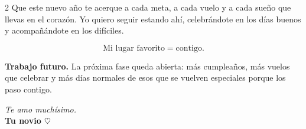 \documentclass[10pt,letterpaper]{article}
\begin{document}
\begin{multicols}{2}
Que este nuevo año te acerque a cada meta, a cada vuelo y a cada sueño que llevas en el corazón. Yo quiero seguir estando ahí, celebrándote en los días buenos y acompañándote en los difíciles.

\begin{equation*}
\boxed{\text{Mi lugar favorito}=\text{contigo}.}
\end{equation*}

\smallskip
\textbf{Trabajo futuro.} La próxima fase queda abierta: más cumpleaños, más vuelos que celebrar y más días normales de esos que se vuelven especiales porque los paso contigo.

\begin{flushright}
\textit{Te amo muchísimo.}\\
\textbf{Tu novio $\heartsuit$}
\end{flushright}
\end{multicols}
\end{document}
